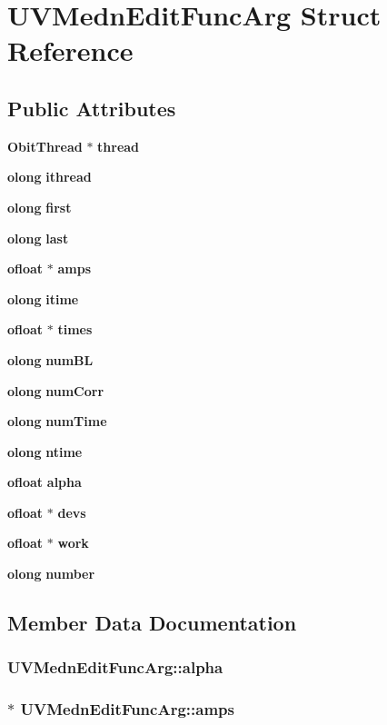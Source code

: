 \section{UVMedn\-Edit\-Func\-Arg Struct Reference}
\label{structUVMednEditFuncArg}
\subsection*{Public Attributes}
\begin{CompactItemize}
\item 
{\bf Obit\-Thread} $\ast$ {\bf thread}
\item 
{\bf olong} {\bf ithread}
\item 
{\bf olong} {\bf first}
\item 
{\bf olong} {\bf last}
\item 
{\bf ofloat} $\ast$ {\bf amps}
\item 
{\bf olong} {\bf itime}
\item 
{\bf ofloat} $\ast$ {\bf times}
\item 
{\bf olong} {\bf num\-BL}
\item 
{\bf olong} {\bf num\-Corr}
\item 
{\bf olong} {\bf num\-Time}
\item 
{\bf olong} {\bf ntime}
\item 
{\bf ofloat} {\bf alpha}
\item 
{\bf ofloat} $\ast$ {\bf devs}
\item 
{\bf ofloat} $\ast$ {\bf work}
\item 
{\bf olong} {\bf number}
\end{CompactItemize}


\subsection{Member Data Documentation}
\subsubsection{ {\bf UVMedn\-Edit\-Func\-Arg::alpha}}\label{structUVMednEditFuncArg_o11}


\subsubsection{$\ast$ {\bf UVMedn\-Edit\-Func\-Arg::amps}}\label{structUVMednEditFuncArg_o4}


